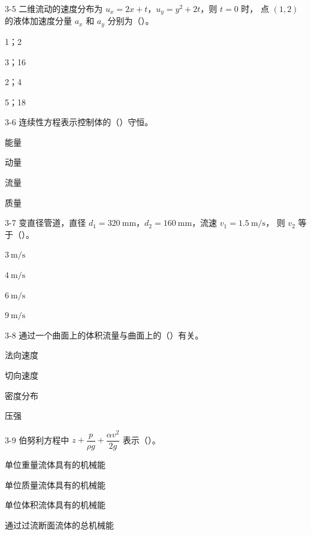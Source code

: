 \begin{ti}
\item[3-5] 二维流动的速度分布为 $u_x=2x+t$，$u_y=y^2+2t$，则 $t=0$ 时，
点 $(1,2)$ 的液体加速度分量 $a_x$ 和 $a_y$ 分别为（\quad）。
\begin{choices}
\item 1；2
\item 3；16
\item 2；4
\item 5；18
\end{choices}

\item[3-6] 连续性方程表示控制体的（\quad）守恒。
\begin{choices}
\item 能量
\item 动量
\item 流量
\item 质量
\end{choices}

\item[3-7] 变直径管道，直径 $d_1=320\ \mathrm{mm}$，$d_2=160\ \mathrm{mm}$，流速 $v_1=1.5\ \mathrm{m/s}$，
则 $v_2$ 等于（\quad）。
\begin{choices}
\item $3\ \mathrm{m/s}$
\item $4\ \mathrm{m/s}$
\item $6\ \mathrm{m/s}$
\item $9\ \mathrm{m/s}$
\end{choices}

\item[3-8] 通过一个曲面上的体积流量与曲面上的（\quad）有关。
\begin{choices}
\item 法向速度
\item 切向速度
\item 密度分布
\item 压强
\end{choices}

\item[3-9] 伯努利方程中 $z+\dfrac{p}{\rho g}+\dfrac{\alpha v^2}{2g}$ 表示（\quad）。
\begin{choices}
\item 单位重量流体具有的机械能
\item 单位质量流体具有的机械能
\item 单位体积流体具有的机械能
\item 通过过流断面流体的总机械能
\end{choices}


\end{ti}
